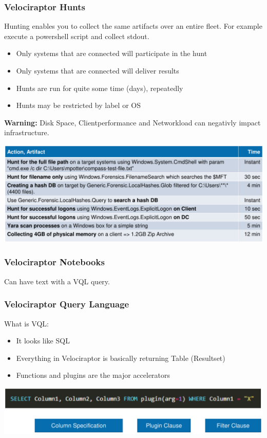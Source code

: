 \columnbreak

\subsubsection{Velociraptor Hunts}
Hunting enables you to collect the same artifacts over an entire fleet. For example execute a powershell script and collect stdout.

\begin{itemize}
    \item Only systems that are connected will participate in the hunt
    \item Only systems that are connected will deliver results
    \item Hunts are run for quite some time (days), repeatedly
    \item Hunts may be restricted by label or OS
\end{itemize}
\textbf{Warning:} Disk Space, Clientperformance and Networkload can negativly impact infrastructure.

\includegraphics[width=\linewidth]{./img/10-velociraptor/velo_speed}

\subsubsection{Velociraptor Notebooks}
Can have text with a VQL query.

\subsubsection{Velociraptor Query Language}
What is VQL:
\begin{itemize}
    \item It looks like SQL
    \item Everything in Velociraptor is basically returning Table (Resultset)
    \item Functions and plugins are the major accelerators
\end{itemize}
\includegraphics[width=\linewidth]{./img/10-velociraptor/vql.png}

